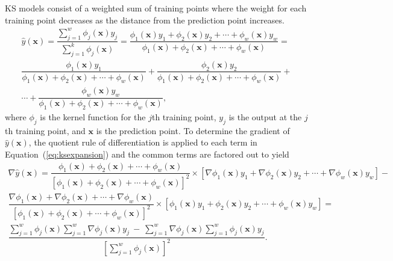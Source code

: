 \ac{KS} models consist of a weighted sum of training points where the weight for each training point decreases as the distance from the prediction point increases.
\begin{multline}
 \label{eq:ksexpansion}
	\hat{y}(\mathbf{x}) = \dfrac{\sum_{j=1}^{w} \phi_j(\mathbf{x})y_j}{\sum_{j=1}^{k} \phi_j(\mathbf{x})} =
	\dfrac{\phi_1(\mathbf{x}) y_1 + \phi_2(\mathbf{x}) y_2 +\cdots + \phi_w(\mathbf{x}) y_w}{\phi_1(\mathbf{x})+ \phi_2(\mathbf{x})+\cdots + \phi_w(\mathbf{x})} = \\
	\dfrac{\phi_1(\mathbf{x}) y_1}{\phi_1(\mathbf{x})+ \phi_2(\mathbf{x}) + \cdots + \phi_w(\mathbf{x})} + \dfrac{\phi_2(\mathbf{x}) y_2}{\phi_1(\mathbf{x})+ \phi_2(\mathbf{x})+\cdots + \phi_w(\mathbf{x})} + \\
	 \cdots + \dfrac{\phi_w(\mathbf{x}) y_w}{\phi_1(\mathbf{x})+ \phi_2(\mathbf{x})+\cdots + \phi_w(\mathbf{x})},
\end{multline}
where $\phi_j$ is the kernel function for the $j$th training point, $y_j$ is the output at the $j$th training point, and $\mathbf{x}$ is the prediction point. 
%
To determine the gradient of $\hat{y}(\mathbf{x})$, the quotient rule of differentiation is applied to each term in Equation~(\ref{eq:ksexpansion}) and the common terms are factored out to yield
\begin{multline}
\label{eq:jacobiancomponent}
\nabla\hat{y}(\mathbf{x}) = \dfrac{\phi_1(\mathbf{x})+ \phi_2(\mathbf{x})+\cdots + \phi_w(\mathbf{x})}{\left[\phi_1(\mathbf{x})+ \phi_2(\mathbf{x})+\cdots + \phi_w(\mathbf{x})\right]^2} \times
\left[\nabla\phi_1(\mathbf{x}) y_1 + \nabla\phi_2(\mathbf{x}) y_2 +\cdots + \nabla\phi_w(\mathbf{x}) y_w\right] - \\
\dfrac{\nabla\phi_1(\mathbf{x})+ \nabla\phi_2(\mathbf{x})+ \cdots + \nabla\phi_w(\mathbf{x})}{\left[\phi_1(\mathbf{x})+ \phi_2(\mathbf{x})+\cdots + \phi_w(\mathbf{x})\right]^2} \times
\left[\phi_1(\mathbf{x}) y_1 + \phi_2(\mathbf{x}) y_2 +\cdots + \phi_w(\mathbf{x}) y_w\right] =\\
	\dfrac{{\sum_{j=1}^{w} \phi_j(\mathbf{x})} {\sum_{j=1}^{w} \nabla\phi_j(\mathbf{x})y_j}~-~{{\sum_{j=1}^{w} \nabla\phi_j(\mathbf{x})}{\sum_{j=1}^{w} \phi_j(\mathbf{x})y_j}}}{\left[\sum_{j=1}^{w} \phi_j(\mathbf{x})\right]^2}.
\end{multline}

